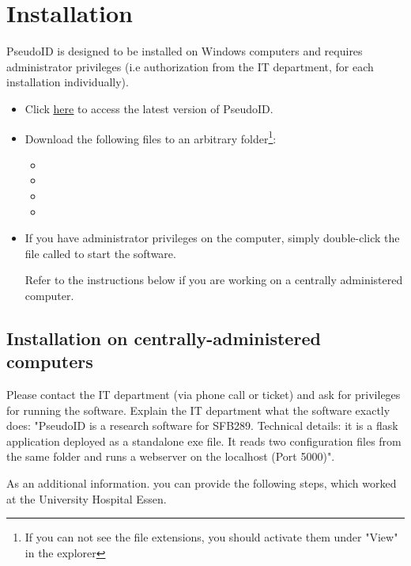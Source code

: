 \section{Installation}
PseudoID is designed to be installed on Windows computers and requires administrator privileges (i.e authorization from the IT department, for each installation individually).

\begin{itemize}
    \item Click \href{https://github.com/spisakt/PseudoID/releases}{\underline{here}} to access the latest version of PseudoID.
    \item Download the following files to an arbitrary folder\footnote{If you can not see the file extensions, you should activate them under "View" in the explorer}: 
    \begin{itemize}
        \item {}
        \item {}
        \item {}
        \item {} 
    \end{itemize}
    \item If you have administrator privileges on the computer, simply double-click the file called  to start the software.
    
    Refer to the instructions below if you are working on a centrally administered computer.
\end{itemize} 

\subsection*{Installation on centrally-administered computers}

Please contact the IT department (via phone call or ticket) and ask for privileges for running the software. Explain the IT department what the software exactly does: "PseudoID is a research software for SFB289. Technical details: it is a flask application deployed as a standalone exe file. It reads two configuration files from the same folder and runs a webserver on the localhost (Port 5000)".

As an additional information. you can provide the following steps, which worked at the University Hospital Essen.

